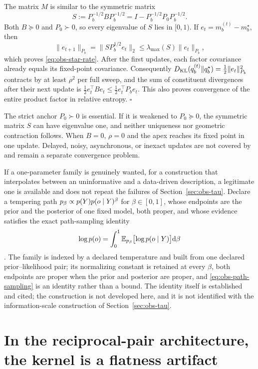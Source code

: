 The matrix \(M\) is similar to the symmetric matrix
\[
S:=P_b^{-1/2}BP_b^{-1/2}
=I-P_b^{-1/2}P_0P_b^{-1/2}.
\]
Both \(B\succeq0\) and \(P_0\succ0\), so every eigenvalue of \(S\) lies in \([0,1)\). If \(e_t=m_b^{(t)}-m_b^\star\), then
\[
\lVert e_{t+1}\rVert_{P_b}
=\lVert S P_b^{1/2}e_t\rVert_2
\leq\lambda_{\max}(S)\lVert e_t\rVert_{P_b},
\]
which proves \eqref{eq:obs-star-rate}. After the first updates, each factor covariance already equals its fixed-point covariance. Consequently
\(D_{\mathrm{KL}}(q_b^{(t)}\Vert q_b^\star)=\tfrac12\lVert e_t\rVert_{P_b}^2\) contracts by at least \(\rho^2\) per full sweep, and the sum of constituent divergences after their next update is
\(\tfrac12e_t^\top Be_t\leq\tfrac12e_t^\top P_be_t\). This also proves convergence of the entire product factor in relative entropy. \(\square\)

The strict anchor \(P_0\succ0\) is essential. If it is weakened to \(P_0\succeq0\), the symmetric matrix \(S\) can have eigenvalue one, and neither uniqueness nor geometric contraction follows. When \(B=0\), \(\rho=0\) and the apex reaches its fixed point in one update. Delayed, noisy, asynchronous, or inexact updates are not covered by  and remain a separate convergence problem. 

If a one-parameter family is genuinely wanted, for a construction that interpolates between an uninformative and a data-driven description, a legitimate one is available and does not repeat the failures of Section~\ref{sec:obs-tau}. Declare a tempering path $p_\beta\propto p(Y)p(o\mid Y)^{\beta}$ for $\beta\in[0,1]$, whose endpoints are the prior and the posterior of one fixed model, both proper, and whose evidence satisfies the exact path-sampling identity
\begin{equation}
\log p(o)=\int_{0}^{1}\mathbb E_{p_\beta}\bigl[\log p(o\mid Y)\bigr]\mathrm{d}\beta
\label{eq:obs-path-sampling}
\end{equation}
\citep{GelmanMeng1998}. The family is indexed by a declared temperature and built from one declared prior--likelihood pair; its normalizing constant is retained at every \(\beta\), both endpoints are proper when the prior and posterior are proper, and \eqref{eq:obs-path-sampling} is an identity rather than a bound. The identity itself is established and cited; the construction is not developed here, and it is not identified with the information-scale construction of Section~\ref{sec:obs-tau}.

\section{In the reciprocal-pair architecture, the kernel is a flatness artifact}
\label{sec:obs-flatness}

